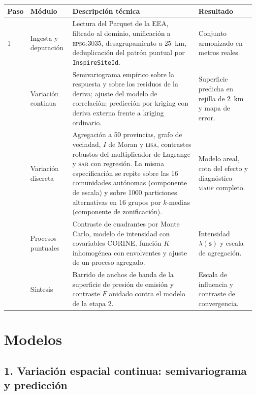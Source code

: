 \documentclass[11pt,a4paper]{article}
\newcommand{\loc}{\bm{s}}
\begin{document}
\begin{center}
\small
\begin{tabular}{@{}p{0.9cm}p{3.2cm}p{5.4cm}p{4.6cm}@{}}
\toprule
\textbf{Paso} & \textbf{Módulo} & \textbf{Descripción técnica} &
\textbf{Resultado} \\
\midrule
1 & Ingesta y depuración &
Lectura del Parquet de la EEA, filtrado al dominio, unificación a
\textsc{epsg}:3035, desagrupamiento a \SI{25}{\kilo\metre}, deduplicación del
patrón puntual por \texttt{InspireSiteId}. &
Conjunto armonizado en metros reales. \\
\addlinespace
2 & Variación continua &
Semivariograma empírico sobre la respuesta y sobre los residuos de la deriva;
ajuste del modelo de correlación; predicción por kriging con deriva externa
frente a kriging ordinario. &
Superficie predicha en rejilla de \SI{2}{\kilo\metre} y mapa de error. \\
\addlinespace
3 & Variación discreta &
Agregación a \num{50} provincias, grafo de vecindad, $I$ de Moran y \textsc{lisa},
contrastes robustos del multiplicador de Lagrange y \textsc{sar} con regresión.
La misma especificación se repite sobre las \num{16} comunidades autónomas
(componente de escala) y sobre \num{1000} particiones alternativas en
\num{16} grupos por $k$-medias (componente de zonificación). &
Modelo areal, cota del efecto y diagnóstico \textsc{maup} completo. \\
\addlinespace
4 & Procesos puntuales &
Contraste de cuadrantes por Monte Carlo, modelo de intensidad con covariables
CORINE, función $K$ inhomogénea con envolventes y ajuste de un proceso
agregado. &
Intensidad $\lambda(\loc)$ y escala de agregación. \\
\addlinespace
5 & Síntesis &
Barrido de anchos de banda de la superficie de presión de emisión y contraste
$F$ anidado contra el modelo de la etapa 2. &
Escala de influencia y contraste de convergencia. \\
\bottomrule
\end{tabular}
\end{center}

\section{Modelos}

\subsection*{1. Variación espacial continua: semivariograma y predicción}
\end{document}

